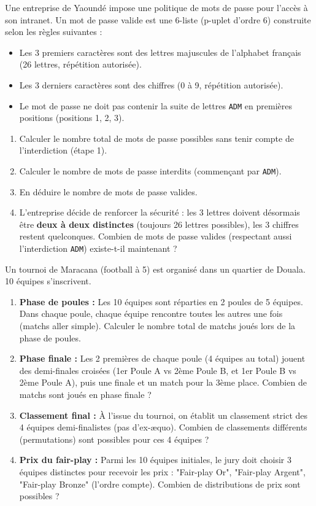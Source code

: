 \documentclass[11pt]{article}
\begin{document}
\begin{exercice}
Une entreprise de Yaoundé impose une politique de mots de passe pour l'accès à son intranet. Un mot de passe valide est une 6-liste (p-uplet d'ordre 6) construite selon les règles suivantes :
\begin{itemize}
    \item Les 3 premiers caractères sont des lettres majuscules de l'alphabet français (26 lettres, répétition autorisée).
    \item Les 3 derniers caractères sont des chiffres (0 à 9, répétition autorisée).
    \item Le mot de passe ne doit pas contenir la suite de lettres \texttt{ADM} en premières positions (positions 1, 2, 3).
\end{itemize}
\begin{enumerate}
    \item Calculer le nombre total de mots de passe possibles sans tenir compte de l'interdiction (étape 1).
    \item Calculer le nombre de mots de passe interdits (commençant par \texttt{ADM}).
    \item En déduire le nombre de mots de passe valides.
    \item L'entreprise décide de renforcer la sécurité : les 3 lettres doivent désormais être \textbf{deux à deux distinctes} (toujours 26 lettres possibles), les 3 chiffres restent quelconques. Combien de mots de passe valides (respectant aussi l'interdiction \texttt{ADM}) existe-t-il maintenant ?
\end{enumerate}
\end{exercice}

\begin{exercice}
Un tournoi de Maracana (football à 5) est organisé dans un quartier de Douala. 10 équipes s'inscrivent.
\begin{enumerate}
    \item \textbf{Phase de poules :} Les 10 équipes sont réparties en 2 poules de 5 équipes. Dans chaque poule, chaque équipe rencontre toutes les autres une fois (matchs aller simple). Calculer le nombre total de matchs joués lors de la phase de poules.
    \item \textbf{Phase finale :} Les 2 premières de chaque poule (4 équipes au total) jouent des demi-finales croisées (1er Poule A vs 2ème Poule B, et 1er Poule B vs 2ème Poule A), puis une finale et un match pour la 3ème place. Combien de matchs sont joués en phase finale ?
    \item \textbf{Classement final :} À l'issue du tournoi, on établit un classement strict des 4 équipes demi-finalistes (pas d'ex-æquo). Combien de classements différents (permutations) sont possibles pour ces 4 équipes ?
    \item \textbf{Prix du fair-play :} Parmi les 10 équipes initiales, le jury doit choisir 3 équipes distinctes pour recevoir les prix : "Fair-play Or", "Fair-play Argent", "Fair-play Bronze" (l'ordre compte). Combien de distributions de prix sont possibles ?
\end{enumerate}
\end{exercice}
\end{document}
